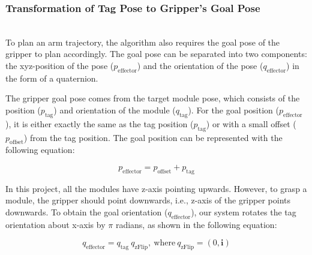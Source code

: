 \subsubsection {Transformation of Tag Pose to Gripper's Goal Pose}~\\
To plan an arm trajectory, the algorithm also requires the goal pose of the gripper to plan accordingly.  The goal pose can be separated into two components: the xyz-position of the pose ($p_{\mathrm{effector}}$) and the orientation of the pose ($q_{\mathrm{effector}}$) in the form of a quaternion.

The gripper goal pose comes from the target module pose, which consists of the position ($p_{\mathrm{tag}}$) and orientation of the module ($q_{\mathrm{tag}}$). For the goal position ($p_{\mathrm{effector}}$), it is either exactly the same as the tag position ($p_{\mathrm{tag}}$) or with a small offset ($p_{\mathrm{offset}}$) from the tag position. The goal position can be represented with the following equation:

\begin{equation}
p_{\mathrm{effector}}= p_{\mathrm{offset}}+p_{\mathrm{tag}}
\end{equation}

In this project, all the modules have z-axis pointing upwards. However, to grasp a module, the gripper should point downwards, i.e., z-axis of the gripper points downwards. To obtain the goal orientation ($q_{\mathrm{effector}}$), our system rotates the tag orientation about x-axis by $\pi$ radians, as shown in the following equation: 

\begin{equation}
q_{\mathrm{effector}}= q_{\mathrm{tag}}\: q_{\mathrm{zFlip}}\mathrm{,\ where\ } q_{\mathrm{zFlip}} =  (0, \mathbf{i})
\end{equation}


